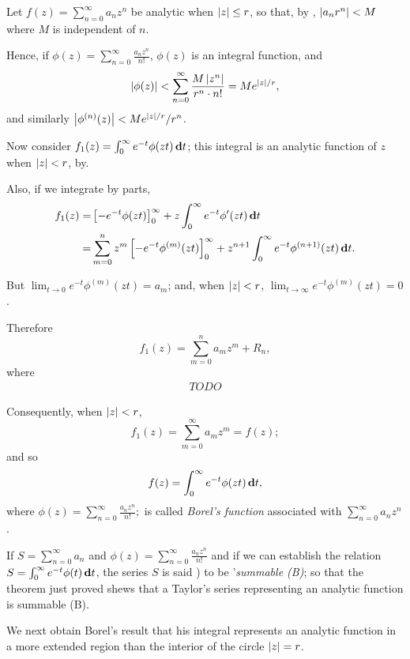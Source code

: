Let $f(z) = \sum_{n=0}^{\infty} a_{n} z^{n}$ be analytic when
$\left| z \right| \leq r$, so that, by
,
$\left|  a_{n} r^{n}  \right| < M$
where $M$ is independent of $n$.

Hence, if
$\phi(z) = \sum_{n=0}^{\infty} \frac{a_{n} z^{n}}{n!}$,
$\phi(z)$ is an integral function, and
$$
\left|  \phi(z)  \right|
<
\sum_{n=0}^{\infty} \frac{M \left| z^{n} \right| }{ r^{n} \cdot n!}
=
M e^{\left| z \right|/r},
$$
and similarly
$\left|  \phi^{(n)}(z)  \right| < M e^{\left| z \right|/r}/r^{n}$.

Now consider
$f_{1}(z) = \int_{0}^{\infty} e^{-t} \phi(zt) \, \mathbf{d} t$;
this integral is an analytic function
of $z$ when $\left| z \right| < r$, by.

Also, if we integrate by parts,
\begin{align*}
  f_{1}(z)
  =&
  \left[ - e^{-t} \phi(zt)  \right]_{0}^{\infty}
  +
  z \int_{0}^{\infty} e^{-t} \phi'(zt) \, \mathbf{d} t
  \\
  =&
  \sum_{m=0}^{n}
  z^{m}
  \left[  - e^{-t} \phi^{(m)}(zt)  \right]_{0}^{\infty}
  +
  z^{n+1}
  \int_{0}^{\infty}
  e^{-t} \phi^{(n+1)}(zt) \, \mathbf{d} t.
\end{align*}

But $\lim_{t \rightarrow 0} e^{-t} \phi^{(m)}(zt) = a_{m}$; and,
when $\left| z \right| < r$,
$\lim_{t \rightarrow \infty} e^{-t} \phi^{(m)}(zt) = 0$.

Therefore
$$
f_{1}(z) = \sum_{m=0}^{n} a_{m} z^{m} + R_{n},
$$
%
%
where
\begin{align*}
  TODO
\end{align*}

Consequently, when $\left| z \right| < r$,
$$
f_{1}(z) = \sum_{m=0}^{\infty} a_{m} z^{m} = f(z);
$$
and so
$$
f(z) = \int_{0}^{\infty} e^{-t} \phi(zt) \, \mathbf{d} t,
$$
where
$
\phi(z) = \sum_{n=0}^{\infty} \frac{a_{n} z^{n}}{n!};
$
is called \emph{Borel's function} associated with
$\sum_{n=0}^{\infty} a_{n} z^{n}$.

If
$S = \sum_{n=0}^{\infty} a_{n}$
and
$\phi(z) = \sum_{n=0}^{\infty} \frac{a_{n} z^{n}}{n!}$
and if we can establish the relation
$S = \int_{0}^{\infty} e^{-t} \phi(t) \, \mathbf{d} t$,
the series $S$ is said ) to be
'\emph{summable (B)}; so that the
theorem just proved shews that a Taylor's series representing an
analytic function is summable (B).

We next obtain Borel's result that his integral represents an analytic
function in a more extended region than the interior of the circle
$\left| z \right| = r$.

